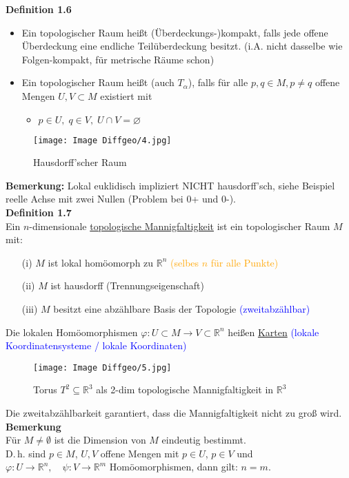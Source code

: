 \documentclass[fleqn, 12pt, letterpaper]{article}
\begin{document}
\textbf{Definition 1.6}\begin{itemize}
	\item Ein topologischer Raum heißt (Überdeckungs-)kompakt, falls jede offene Überdeckung eine endliche Teilüberdeckung besitzt. (i.A. nicht dasselbe wie Folgen-kompakt, für metrische Räume schon)
	\item Ein topologischer Raum heißt  (auch $T_{\alpha}$), falls für alle $p, q\in M, p\neq q$ offene Mengen $U, V\subset M$ existiert mit \begin{itemize}
		\item $p\in U,\; q\in V,\;U\cap V =\varnothing$
	\end{itemize}
\end{itemize}
\begin{figure}[H]
    \centering
    \texttt{[image: Image Diffgeo/4.jpg]}
	\caption{Hausdorff'scher Raum}
 \end{figure}
\textbf{Bemerkung:} Lokal euklidisch impliziert NICHT hausdorff'sch, siehe Beispiel reelle Achse mit zwei Nullen (Problem bei 0+ und 0-).\\

\textbf{Definition 1.7}\\
Ein $n$-dimensionale \underline{topologische Mannigfaltigkeit} ist ein topologischer Raum $M$ mit:
\begin{itemize}
    \item[(i)] $M$ ist lokal homöomorph zu $\mathbb{R}^n$ \hfill \textcolor{orange}{(selbes $n$ für alle Punkte)}
    \item[(ii)] $M$ ist hausdorff (Trennungseigenschaft)
    \item[(iii)] $M$ besitzt eine abzählbare Basis der Topologie \hfill \textcolor{blue}{(zweitabzählbar)}
\end{itemize}

Die lokalen Homöomorphismen $\varphi: U \subset M \to V \subset \mathbb{R}^n$ heißen \underline{Karten} 
\textcolor{blue}{(lokale Koordinatensysteme / lokale Koordinaten)}
\begin{figure}[H]
    \centering
    \texttt{[image: Image Diffgeo/5.jpg]}
	\caption{Torus $T^2\subseteq \mathbb{R}^3$ als 2-dim topologische Mannigfaltigkeit in $\mathbb{R}^3$}
 \end{figure}
Die zweitabzählbarkeit garantiert, dass die Mannigfaltigkeit nicht zu groß wird.\\

\textbf{Bemerkung}\\
Für $M \neq \emptyset$ ist die Dimension von $M$ eindeutig bestimmt.\\
D.\,h. sind $p \in M$, $U, V$ offene Mengen mit $p \in U$, $p \in V$ und $\varphi: U \to \mathbb{R}^n, \quad \psi: V \to \mathbb{R}^m$ Homöomorphismen, dann gilt: $n = m$.
\end{document}
